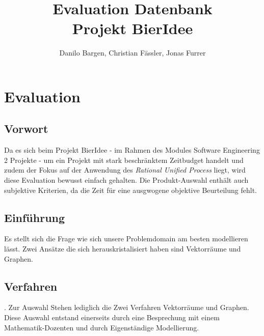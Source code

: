 \documentclass[10pt,a4paper]{scrartcl}
\author{Danilo Bargen, Christian Fässler, Jonas Furrer}
\title{Evaluation Datenbank\\Projekt BierIdee}
\begin{document}
\begin{titlepage}
	\maketitle
	\vspace{120mm}
	\thispagestyle{empty} %
\end{titlepage}

\section{Evaluation}
\subsection{Vorwort}
Da es sich beim Projekt BierIdee - im Rahmen des Modules Software Engineering 2 Projekte - um ein Projekt mit stark beschränktem Zeitbudget handelt und zudem der Fokus auf der Anwendung des \textit{Rational Unified Process} liegt, wird diese Evaluation bewusst einfach gehalten. Die Produkt-Auswahl enthält auch subjektive Kriterien, da die Zeit für eine ausgwogene objektive Beurteilung fehlt.

\subsection{Einführung}
Es stellt sich die Frage wie sich unsere Problemdomain am besten modellieren lässt. Zwei Ansätze die sich herauskristalisiert haben sind Vektorräume und Graphen.


\subsection{Verfahren}. 
Zur Auswahl Stehen lediglich die Zwei Verfahren Vektorräume und Graphen. Diese Auswahl entstand einerseits durch eine Besprechung mit einem Mathematik-Dozenten und durch Eigenständige Modellierung.
\end{document}
